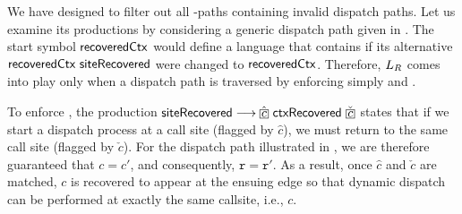 \begin{comment}
Although this case does not lead to an imprecise points-to results, such invalid value flow could indeed cause imprecise results when analyzing other programs. Consider the example in \Cref{fig:LRExample}, under \kcs{k} (with $k \geq 2$), we have $\cipointsto{\mathtt{v1}} = \{{\color{purple} \mathtt{O1}}\}$ and $\cipointsto{\mathtt{v2}} = \{{\color{purple} \mathtt{O2}}\}$. However, in \LFC, we would have $\cipointsto{\mathtt{v1}} = \{{\color{purple} \mathtt{O1}, \mathtt{O2}}\}$ and $\cipointsto{\mathtt{v2}} = \{{\color{purple} \mathtt{O1}, \mathtt{O2}}\}$, with \commentfont{O2} in $\cipointsto{\mathtt{v1}}$ and \commentfont{O1} in $\cipointsto{\mathtt{v2}}$ being spurious. 
Such imprecision is caused by the same reason that object \commentfont{A1}
could flow to \texttt{a} (line 5) under two different contexts, [\texttt{c1}] and [\texttt{c2}]:

\end{comment}




 
 
 We have designed \LR 
 to filter out all \LFC-paths containing invalid dispatch paths. Let us examine its productions by considering
a generic dispatch path given in . The start symbol $\textsf{recoveredCtx}$
would define a language that contains \LC if its alternative $\textsf{recoveredCtx} ~ \textsf{siteRecovered}$ were changed to
$\textsf{recoveredCtx}$. Therefore, $\mbox{${L}_R$}$ comes into play only when a dispatch path is traversed by
enforcing simply
\dispatchconOne and \dispatchconTwo.

 To enforce 
  \dispatchconOne,
  the production $\siterecovered \longrightarrow \hat{\boxed{c}} ~ \ctxrecovered ~ \check{\boxed{c}}$ states
  that if we start a dispatch process at a call site  (flagged by 
  $\hat{\boxed{c}}$), we must  return to the same call site 
(flagged by $\check{\boxed{c}}$). For the dispatch path  illustrated in
, we are therefore guaranteed that
$c=c'$, and consequently, $\mathtt{r}=\mathtt{r}'$. As a result, once  $\hat{\boxed{c}}$ and
 $\check{\boxed{c}}$ are matched, $c$ is recovered to appear at the ensuing
 \indispatch edge so that dynamic dispatch can be performed at exactly the
 same callsite, i.e., $c$. 
 
